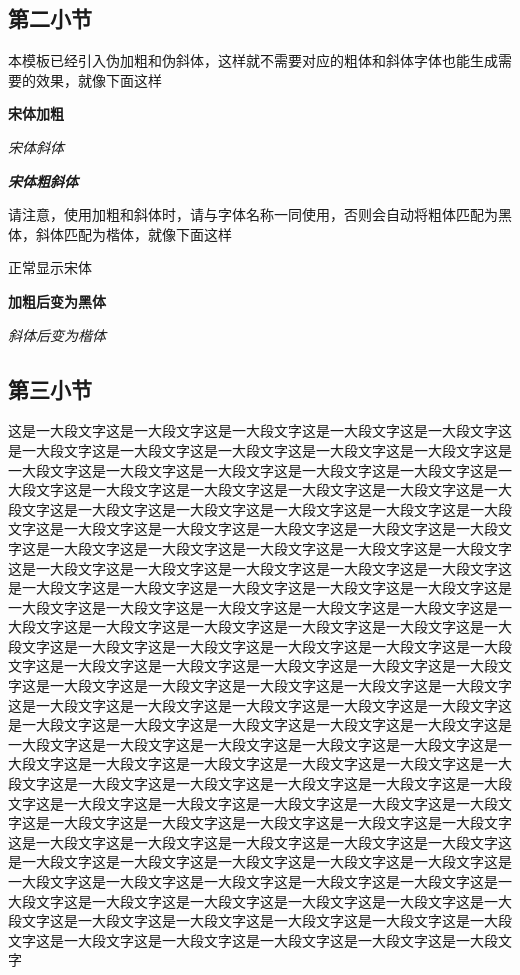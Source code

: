 \documentclass[supercite]{HustGraduPaper}
\begin{document}
	\subsection{第二小节}
	本模板已经引入伪加粗和伪斜体，这样就不需要对应的粗体和斜体字体也能生成需要的效果，就像下面这样
	
	{\songti \bfseries 宋体加粗}
	
	{\songti \itshape 宋体斜体}
	
	{\songti \bfseries \itshape 宋体粗斜体}
	
	请注意，使用加粗和斜体时，请与字体名称一同使用，否则会自动将粗体匹配为黑体，斜体匹配为楷体，就像下面这样
	
	{正常显示宋体}
	
	{\bfseries 加粗后变为黑体}
	
	{\itshape 斜体后变为楷体}
	
	\subsection{第三小节}
	这是一大段文字这是一大段文字这是一大段文字这是一大段文字这是一大段文字这是一大段文字这是一大段文字这是一大段文字这是一大段文字这是一大段文字这是一大段文字这是一大段文字这是一大段文字这是一大段文字这是一大段文字这是一大段文字这是一大段文字这是一大段文字这是一大段文字这是一大段文字这是一大段文字这是一大段文字这是一大段文字这是一大段文字这是一大段文字这是一大段文字这是一大段文字这是一大段文字这是一大段文字这是一大段文字这是一大段文字这是一大段文字这是一大段文字这是一大段文字这是一大段文字这是一大段文字这是一大段文字这是一大段文字这是一大段文字这是一大段文字这是一大段文字这是一大段文字这是一大段文字这是一大段文字这是一大段文字这是一大段文字这是一大段文字这是一大段文字这是一大段文字这是一大段文字这是一大段文字这是一大段文字这是一大段文字这是一大段文字这是一大段文字这是一大段文字这是一大段文字这是一大段文字这是一大段文字这是一大段文字这是一大段文字这是一大段文字这是一大段文字这是一大段文字这是一大段文字这是一大段文字这是一大段文字这是一大段文字这是一大段文字这是一大段文字这是一大段文字这是一大段文字这是一大段文字这是一大段文字这是一大段文字这是一大段文字这是一大段文字这是一大段文字这是一大段文字这是一大段文字这是一大段文字这是一大段文字这是一大段文字这是一大段文字这是一大段文字这是一大段文字这是一大段文字这是一大段文字这是一大段文字这是一大段文字这是一大段文字这是一大段文字这是一大段文字这是一大段文字这是一大段文字这是一大段文字这是一大段文字这是一大段文字这是一大段文字这是一大段文字这是一大段文字这是一大段文字这是一大段文字这是一大段文字这是一大段文字这是一大段文字这是一大段文字这是一大段文字这是一大段文字这是一大段文字这是一大段文字这是一大段文字这是一大段文字这是一大段文字这是一大段文字这是一大段文字这是一大段文字这是一大段文字这是一大段文字这是一大段文字这是一大段文字这是一大段文字这是一大段文字这是一大段文字这是一大段文字这是一大段文字这是一大段文字这是一大段文字这是一大段文字这是一大段文字这是一大段文字这是一大段文字这是一大段文字这是一大段文字这是一大段文字这是一大段文字这是一大段文字这是一大段文字这是一大段文字
\end{document}
